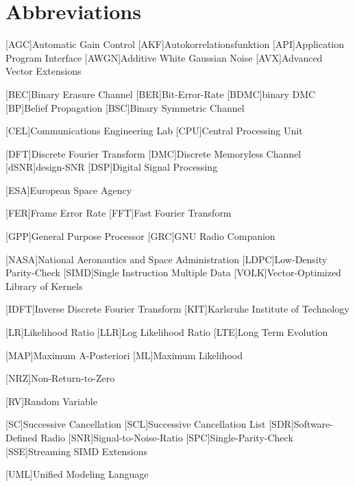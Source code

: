 \chapter{Abbreviations}
\begin{acronym}[TROLL]
  [AGC]{Automatic Gain Control}
  [AKF]{Autokorrelationsfunktion}
  [API]{Application Program Interface}
  [AWGN]{Additive White Gaussian Noise}
  [AVX]{Advanced Vector Extensions}

  [BEC]{Binary Erasure Channel}
  [BER]{Bit-Error-Rate}
  [BDMC]{binary \acs{DMC}}
  [BP]{Belief Propagation}
  [BSC]{Binary Symmetric Channel}

  [CEL]{Communications Engineering Lab}
  [CPU]{Central Processing Unit}

  [DFT]{Discrete Fourier Transform}
  [DMC]{Discrete Memoryless Channel}
  [dSNR]{design-\ac{SNR}}
  [DSP]{Digital Signal Processing}

  [ESA]{European Space Agency}

  [FER]{Frame Error Rate}
  [FFT]{Fast Fourier Transform}

  [GPP]{General Purpose Processor}
  [GRC]{GNU Radio Companion}

  [NASA]{National Aeronautics and Space Administration}
  [LDPC]{Low-Density Parity-Check}
  [SIMD]{Single Instruction Multiple Data}
  [VOLK]{Vector-Optimized Library of Kernels}

  [IDFT]{Inverse Discrete Fourier Transform}
  [KIT]{Karlsruhe Institute of Technology}

  [LR]{Likelihood Ratio}
  [LLR]{Log Likelihood Ratio}
  [LTE]{Long Term Evolution}

  [MAP]{Maximum A-Posteriori}
  [ML]{Maximum Likelihood}

  [NRZ]{Non-Return-to-Zero}

  [RV]{Random Variable}

  [SC]{Successive Cancellation}
  [SCL]{Successive Cancellation List}
  [SDR]{Software-Defined Radio}
  [SNR]{Signal-to-Noise-Ratio}
  [SPC]{Single-Parity-Check}
  [SSE]{Streaming SIMD Extensions}

 [UML]{Unified Modeling Language}
\end{acronym}
